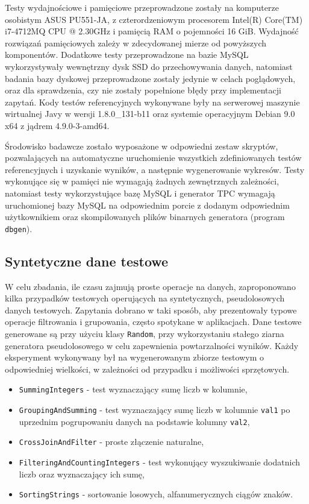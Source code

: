 \documentclass[12pt,twoside,openright]{extarticle}
\begin{document}
    Testy wydajnościowe i pamięciowe przeprowadzone zostały na komputerze osobistym ASUS PU551-JA, z czterordzeniowym procesorem Intel(R) Core(TM) i7-4712MQ CPU @ 2.30GHz i pamięcią RAM o pojemności 16 GiB. Wydajność rozwiązań pamięciowych zależy w zdecydowanej mierze od powyższych komponentów. Dodatkowe testy przeprowadzone na bazie MySQL wykorzystywały wewnętrzny dysk SSD  do przechowywania danych, natomiast badania bazy dyskowej przeprowadzone zostały jedynie w celach poglądowych, oraz dla sprawdzenia, czy nie zostały popełnione błędy przy implementacji zapytań. Kody testów referencyjnych wykonywane były na serwerowej maszynie wirtualnej Javy w wersji 1.8.0\_131-b11 oraz systemie operacyjnym Debian 9.0 x64 z jądrem 4.9.0-3-amd64.

    Środowisko badawcze zostało wyposażone w odpowiedni zestaw skryptów, pozwalających na automatyczne uruchomienie wszystkich zdefiniowanych testów referencyjnych i uzyskanie wyników, a następnie wygenerowanie wykresów. Testy wykonujące się w pamięci nie wymagają żadnych zewnętrznych zależności, natomiast testy wykorzystujące bazę MySQL i generator TPC wymagają uruchomionej bazy MySQL na odpowiednim porcie z dodanym odpowiednim użytkownikiem oraz skompilowanych plików binarnych generatora (program \texttt{dbgen}).


\subsection{Syntetyczne dane testowe}

    W celu zbadania, ile czasu zajmują proste operacje na danych, zaproponowano kilka przypadków testowych operujących na syntetycznych, pseudolosowych danych testowych. Zapytania dobrano w taki sposób, aby prezentowały typowe operacje filtrowania i grupowania, często spotykane w aplikacjach. Dane testowe generowane są przy użyciu klasy \texttt{Random}, przy wykorzystaniu stałego ziarna generatora pseudolosowego w celu zapewnienia powtarzalności wyników. Każdy eksperyment wykonywany był na wygenerowanym zbiorze testowym o odpowiedniej wielkości, w zależności od przypadku i możliwości sprzętowych.

\begin{itemize}
    \item \texttt{SummingIntegers} - test wyznaczający sumę liczb w kolumnie,
    \item \texttt{GroupingAndSumming} - test wyznaczający sumę liczb w kolumnie \texttt{val1} po uprzednim pogrupowaniu danych na podstawie kolumny \texttt{val2},
    \item \texttt{CrossJoinAndFilter} - proste złączenie naturalne,
    \item \texttt{FilteringAndCountingIntegers} - test wykonujący wyszukiwanie dodatnich liczb oraz wyznaczający ich sumę,
    \item \texttt{SortingStrings} - sortowanie losowych, alfanumerycznych ciągów znaków.
\end{itemize}
\end{document}
